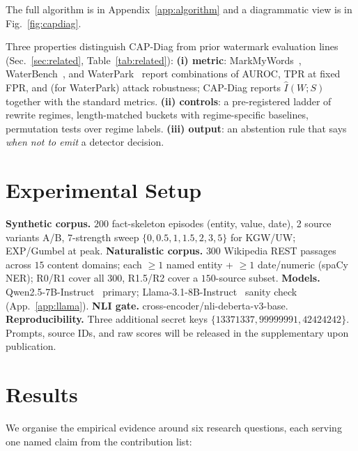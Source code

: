 \documentclass[11pt]{article}
\begin{document}
The full algorithm is in Appendix~\ref{app:algorithm} and a diagrammatic
view is in Fig.~\ref{fig:capdiag}.

Three properties distinguish CAP-Diag from prior watermark evaluation
lines (Sec.~\ref{sec:related}, Table~\ref{tab:related}):
\textbf{(i) metric}: MarkMyWords~\citep{piet2024markmywords},
WaterBench~\citep{tu2024waterbench}, and WaterPark~\citep{liang2024waterpark}
report combinations of AUROC, TPR at fixed FPR, and (for WaterPark) attack
robustness; CAP-Diag reports $\hat I(W;S)$ together with the standard
metrics.
\textbf{(ii) controls}: a pre-registered ladder of rewrite regimes,
length-matched buckets with regime-specific baselines, permutation tests
over regime labels.
\textbf{(iii) output}: an abstention rule that says \emph{when not to
emit} a detector decision.

\section{Experimental Setup}
\label{sec:setup}

\textbf{Synthetic corpus.} $200$ fact-skeleton episodes (entity, value,
date), 2 source variants A/B, 7-strength sweep $\{0,0.5,1,1.5,2,3,5\}$ for
KGW/UW; EXP/Gumbel at peak.
\textbf{Naturalistic corpus.} $300$ Wikipedia REST passages across $15$
content domains; each $\geq\!1$ named entity + $\geq\!1$ date/numeric
(spaCy NER); R0/R1 cover all $300$, R1.5/R2 cover a $150$-source subset.
\textbf{Models.} Qwen2.5-7B-Instruct~\citep{qwen2_5_7b} primary;
Llama-3.1-8B-Instruct~\citep{grattafiori2024llama3} sanity check
(App.~\ref{app:llama}).
\textbf{NLI gate.} cross-encoder/nli-deberta-v3-base.
\textbf{Reproducibility.} Three additional secret keys
$\{13371337, 99999991, 42424242\}$. Prompts, source IDs, and raw scores
will be released in the supplementary upon publication.

\section{Results}
\label{sec:results}

We organise the empirical evidence around six research questions, each
serving one named claim from the contribution list:
\end{document}
